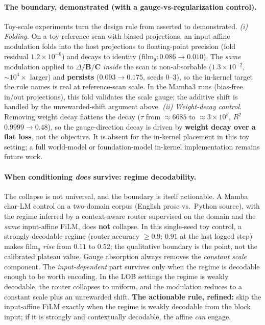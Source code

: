 \documentclass{article}
\begin{document}
\paragraph{The boundary, demonstrated (with a gauge-vs-regularization control).}
Toy-scale experiments turn the design rule from asserted to demonstrated.
\emph{(i) Folding.} On a toy reference scan with biased projections, an
input-affine modulation folds into the host projections to floating-point precision
(fold residual $1.2\times10^{-6}$) and decays to identity
($\mathrm{film}_g: 0.086\to0.010$). The \emph{same} modulation applied to
$\Delta/\mathbf{B}/\mathbf{C}$ \emph{inside} the scan is non-absorbable
($1.3\times10^{-2}$, $\sim10^4\times$ larger) and \textbf{persists}
($0.093\to0.175$, seeds 0--3), so the in-kernel target the rule names is real at
reference-scan scale. In the Mamba3 runs (bias-free in/out projections), this fold
validates the scale gauge; the additive shift is handled by the unrewarded-shift
argument above.
\emph{(ii) Weight-decay control.} Removing weight decay flattens the decay ($\tau$
from $\approx6685$ to $\approx3\times10^5$, $R^2$ $0.9999\!\to\!0.48$), so the
gauge-direction decay is driven by \textbf{weight decay over a flat loss}, not the
objective. It is absent for the in-kernel placement in this toy setting; a full
world-model or foundation-model in-kernel implementation remains future work.

\paragraph{When conditioning \emph{does} survive: regime decodability.}
The collapse is not universal, and the boundary is itself actionable. A Mamba
char-LM control on a two-domain corpus (English prose vs.\ Python source), with the
regime inferred by a context-aware router supervised on the domain and the
\emph{same} input-affine FiLM, does \textbf{not} collapse. In this single-seed toy
control, a strongly-decodable regime (router accuracy $\ge0.9$; $0.91$ at the last
logged step) makes
$\mathrm{film}_g$ \emph{rise} from $0.11$ to $0.52$; the qualitative boundary is the
point, not the calibrated plateau value. Gauge absorption always removes the
\emph{constant scale} component. The
\emph{input-dependent} part survives only when the regime is decodable enough to be
worth encoding. In the LOB settings the regime is weakly decodable, the router
collapses to uniform, and the modulation reduces to a constant scale plus an
unrewarded shift.
\textbf{The actionable rule, refined:} skip the input-affine FiLM exactly when the
regime is weakly decodable from the block input; if it is strongly and contextually
decodable, the affine \emph{can} engage.
\end{document}
